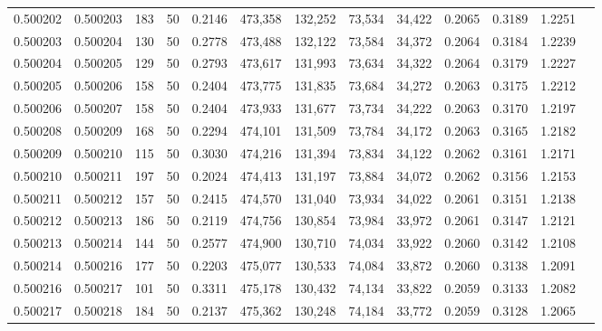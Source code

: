 \begin{tabular}{rrrrrrrrrrrrr}
0.500202 & 0.500203 & 183 &  50 &                                     0.2146 & 473,358 & 132,252 &  73,534 &  34,422 & 0.2065 & 0.3189 & 1.2251 \\
0.500203 & 0.500204 & 130 &  50 &                                     0.2778 & 473,488 & 132,122 &  73,584 &  34,372 & 0.2064 & 0.3184 & 1.2239 \\
0.500204 & 0.500205 & 129 &  50 &                                     0.2793 & 473,617 & 131,993 &  73,634 &  34,322 & 0.2064 & 0.3179 & 1.2227 \\
0.500205 & 0.500206 & 158 &  50 &                                     0.2404 & 473,775 & 131,835 &  73,684 &  34,272 & 0.2063 & 0.3175 & 1.2212 \\
0.500206 & 0.500207 & 158 &  50 &                                     0.2404 & 473,933 & 131,677 &  73,734 &  34,222 & 0.2063 & 0.3170 & 1.2197 \\
0.500208 & 0.500209 & 168 &  50 &                                     0.2294 & 474,101 & 131,509 &  73,784 &  34,172 & 0.2063 & 0.3165 & 1.2182 \\
0.500209 & 0.500210 & 115 &  50 &                                     0.3030 & 474,216 & 131,394 &  73,834 &  34,122 & 0.2062 & 0.3161 & 1.2171 \\
0.500210 & 0.500211 & 197 &  50 &                                     0.2024 & 474,413 & 131,197 &  73,884 &  34,072 & 0.2062 & 0.3156 & 1.2153 \\
0.500211 & 0.500212 & 157 &  50 &                                     0.2415 & 474,570 & 131,040 &  73,934 &  34,022 & 0.2061 & 0.3151 & 1.2138 \\
0.500212 & 0.500213 & 186 &  50 &                                     0.2119 & 474,756 & 130,854 &  73,984 &  33,972 & 0.2061 & 0.3147 & 1.2121 \\
0.500213 & 0.500214 & 144 &  50 &                                     0.2577 & 474,900 & 130,710 &  74,034 &  33,922 & 0.2060 & 0.3142 & 1.2108 \\
0.500214 & 0.500216 & 177 &  50 &                                     0.2203 & 475,077 & 130,533 &  74,084 &  33,872 & 0.2060 & 0.3138 & 1.2091 \\
0.500216 & 0.500217 & 101 &  50 &                                     0.3311 & 475,178 & 130,432 &  74,134 &  33,822 & 0.2059 & 0.3133 & 1.2082 \\
0.500217 & 0.500218 & 184 &  50 &                                     0.2137 & 475,362 & 130,248 &  74,184 &  33,772 & 0.2059 & 0.3128 & 1.2065 \\

\end{tabular}
